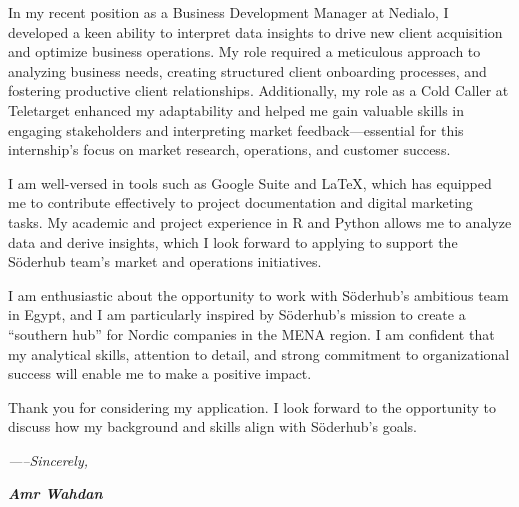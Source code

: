 \documentclass[12pt]{article}
\newcommand{\fancy}[1]{\Large\textbf{\textit{#1}}}
\begin{document}
\vspace{1em}
In my recent position as a Business Development Manager at Nedialo, I developed a keen ability to interpret data insights to drive new client acquisition and optimize business operations. My role required a meticulous approach to analyzing business needs, creating structured client onboarding processes, and fostering productive client relationships. Additionally, my role as a Cold Caller at Teletarget enhanced my adaptability and helped me gain valuable skills in engaging stakeholders and interpreting market feedback—essential for this internship’s focus on market research, operations, and customer success. \par

\vspace{1em}
I am well-versed in tools such as Google Suite and LaTeX, which has equipped me to contribute effectively to project documentation and digital marketing tasks. My academic and project experience in R and Python allows me to analyze data and derive insights, which I look forward to applying to support the Söderhub team’s market and operations initiatives. \par

\vspace{1em}
I am enthusiastic about the opportunity to work with Söderhub's ambitious team in Egypt, and I am particularly inspired by Söderhub's mission to create a “southern hub” for Nordic companies in the MENA region. I am confident that my analytical skills, attention to detail, and strong commitment to organizational success will enable me to make a positive impact. \par

\vspace{1em}
Thank you for considering my application. I look forward to the opportunity to discuss how my background and skills align with Söderhub's goals.


\vspace{1.5em}

\textit{-----Sincerely,}

\vspace{1em}

\fancy{Amr Wahdan}
\end{document}
